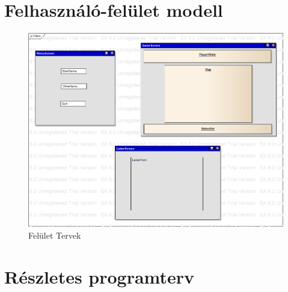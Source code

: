 \documentclass[a4paper,12pt]{report}
\begin{document}
\section{Felhasználó-felület modell}

\begin{figure}[hbtp]
\centering
\includegraphics[width=1\textwidth]{ViewScreen.png}
\caption{Felület Tervek}
\label{fig:vs}
\end{figure}

\section{Részletes programterv}
\end{document}
